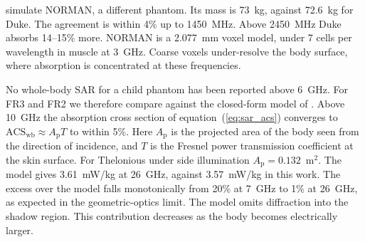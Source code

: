 \documentclass{iopjournal}
\begin{document}
\citet{dimbylow2002fdtd} simulate NORMAN, a different phantom.
Its mass is 73~kg, against 72.6~kg for Duke.
The agreement is within 4\% up to 1450~MHz.
Above 2450~MHz Duke absorbs 14--15\% more.
NORMAN is a 2.077~mm voxel model, under 7 cells per wavelength in muscle at 3~GHz.
Coarse voxels under-resolve the body surface, where absorption is concentrated at these frequencies.

No whole-body \gls{SAR} for a child phantom has been reported above 6~GHz.
For FR3 and FR2 we therefore compare against the closed-form model of \citet{kodera2024wbasar}.
Above 10~GHz the absorption cross section of equation~(\ref{eq:sar_acs}) converges to $\mathrm{ACS}_\mathrm{wb} \approx A_\mathrm{p} T$ to within 5\%.
Here $A_\mathrm{p}$ is the projected area of the body seen from the direction of incidence, and $T$ is the Fresnel power transmission coefficient at the skin surface.
For Thelonious under side illumination $A_\mathrm{p} = 0.132$~m$^2$.
The model gives 3.61~mW/kg at 26~GHz, against 3.57~mW/kg in this work.
The excess over the model falls monotonically from 20\% at 7~GHz to 1\% at 26~GHz, as expected in the geometric-optics limit.
The model omits diffraction into the shadow region.
This contribution decreases as the body becomes electrically larger.
\end{document}
